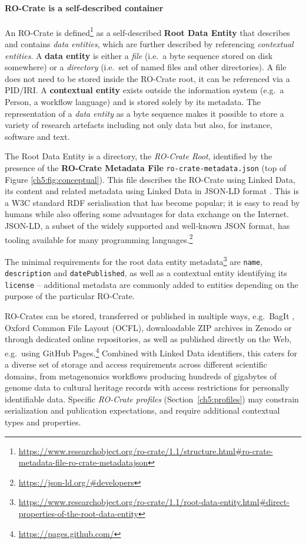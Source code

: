 \paragraph{RO-Crate is a self-described container}\label{ch5:selfdescribed}

An RO-Crate is defined\footnote{\url{https://www.researchobject.org/ro-crate/1.1/structure.html\#ro-crate-metadata-file-ro-crate-metadatajson}} as a self-described \textbf{Root Data Entity} that describes
and contains \emph{data entities}, which are further described by
referencing \emph{contextual entities}. A \textbf{data entity} is either
a \emph{file} (i.e.~a byte sequence stored on disk somewhere) or a
\emph{directory} (i.e.~set of named files and other directories). A file
does not need to be stored inside the RO-Crate root, it can be
referenced via a PID/IRI. A \textbf{contextual entity} exists outside
the information system (e.g.~a Person, a workflow language) and is
stored solely by its metadata. The representation of a \emph{data
entity} as a byte sequence makes it possible to store a variety of
research artefacts including not only data but also, for instance,
software and text.


The Root Data Entity is a directory, the \emph{RO-Crate Root},
identified by the presence of the \textbf{RO-Crate Metadata File}
\texttt{ro-crate-metadata.json} (top of Figure \vref{ch5:fig:conceptual}). This file describes the
RO-Crate using Linked Data, its content and related metadata using
Linked Data in JSON-LD format \cite{ch5-112}. This
is a W3C standard RDF serialisation that has become popular; it is easy
to read by humans while also offering some advantages for data exchange
on the Internet. JSON-LD, a subset of the widely supported and
well-known JSON format, has tooling available for many programming languages.\footnote{\url{https://json-ld.org/\#developers}}

The minimal requirements for the root data entity
metadata\footnote{\url{https://www.researchobject.org/ro-crate/1.1/root-data-entity.html\#direct-properties-of-the-root-data-entity}}
are \texttt{name}, \texttt{description} and \texttt{datePublished}, as well as a contextual
entity identifying its \texttt{license} -- additional metadata are commonly
added to entities depending on the purpose of the particular RO-Crate.

RO-Crates can be stored, transferred or published in multiple ways,
e.g.~BagIt \cite{ch5-74}, Oxford
Common File Layout \cite{ch5-96} (OCFL),
downloadable ZIP archives in Zenodo or through dedicated online
repositories, as well as published directly on the Web, e.g.~using
GitHub Pages.\footnote{\url{https://pages.github.com/}} Combined with Linked Data identifiers, this caters for a diverse set of storage and access
requirements across different scientific domains, from metagenomics
workflows producing hundreds of gigabytes of genome data to cultural
heritage records with access restrictions for personally identifiable
data. Specific \emph{RO-Crate profiles} (Section~\vref{ch5:profiles}) may constrain serialization
and publication expectations, and require additional contextual types
and properties.

